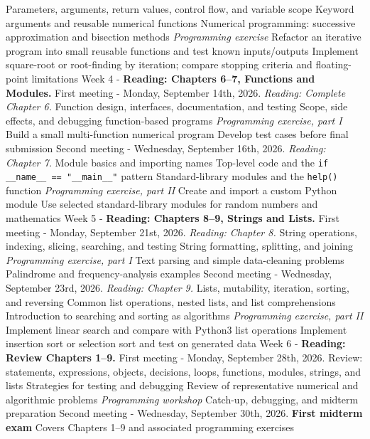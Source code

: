 \documentclass[10pt]{article}
\begin{document}
\begin{outline}[enumerate]
\3 Parameters, arguments, return values, control flow, and variable scope
\3 Keyword arguments and reusable numerical functions
\3 Numerical programming: successive approximation and bisection methods
\3 \textit{Programming exercise}
\4 Refactor an iterative program into small reusable functions and test known inputs/outputs
\4 Implement square-root or root-finding by iteration; compare stopping criteria and floating-point limitations
\1 Week 4 - \textbf{Reading: Chapters 6--7, Functions and Modules.}
\2 First meeting - Monday, September 14th, 2026. \textit{Reading: Complete Chapter 6.}
\3 Function design, interfaces, documentation, and testing
\3 Scope, side effects, and debugging function-based programs
\3 \textit{Programming exercise, part I}
\4 Build a small multi-function numerical program
\4 Develop test cases before final submission
\2 Second meeting - Wednesday, September 16th, 2026. \textit{Reading: Chapter 7.}
\3 Module basics and importing names
\3 Top-level code and the \texttt{if \_\_name\_\_ == "\_\_main\_\_"} pattern
\3 Standard-library modules and the \texttt{help()} function
\3 \textit{Programming exercise, part II}
\4 Create and import a custom Python module
\4 Use selected standard-library modules for random numbers and mathematics
\1 Week 5 - \textbf{Reading: Chapters 8--9, Strings and Lists.}
\2 First meeting - Monday, September 21st, 2026. \textit{Reading: Chapter 8.}
\3 String operations, indexing, slicing, searching, and testing
\3 String formatting, splitting, and joining
\3 \textit{Programming exercise, part I}
\4 Text parsing and simple data-cleaning problems
\4 Palindrome and frequency-analysis examples
\2 Second meeting - Wednesday, September 23rd, 2026. \textit{Reading: Chapter 9.}
\3 Lists, mutability, iteration, sorting, and reversing
\3 Common list operations, nested lists, and list comprehensions
\3 Introduction to searching and sorting as algorithms
\3 \textit{Programming exercise, part II}
\4 Implement linear search and compare with Python3 list operations
\4 Implement insertion sort or selection sort and test on generated data
\1 Week 6 - \textbf{Reading: Review Chapters 1--9.}
\2 First meeting - Monday, September 28th, 2026.
\3 Review: statements, expressions, objects, decisions, loops, functions, modules, strings, and lists
\3 Strategies for testing and debugging
\3 Review of representative numerical and algorithmic problems
\3 \textit{Programming workshop}
\4 Catch-up, debugging, and midterm preparation
\2 Second meeting - Wednesday, September 30th, 2026.
\3 \textbf{First midterm exam}
\4 Covers Chapters 1--9 and associated programming exercises

\end{outline}
\end{document}
